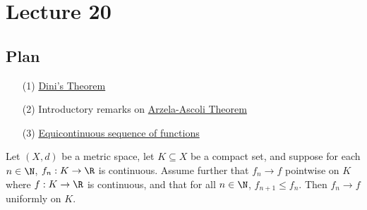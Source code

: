 \section{Lecture 20}

\subsection{Plan}

\begin{enumerate}
    \item[(1)] {\hyperref[Dini's Theorem]{Dini's Theorem}}
    \item[(2)] Introductory remarks on {\hyperref[the Arzela-Ascoli Theorem]{Arzela-Ascoli Theorem}}
    \item[(3)] {\hyperref[Equicontinuous sequence of functions]{Equicontinuous sequence of functions}} 
\end{enumerate}

\begin{theorem}\label{Dini's Theorem}
    Let \( (X,d) \) be a metric space, let \( K \subseteq  X   \) be a compact set, and suppose for each \( n \in \N  \), \( {f}_{n} : K \to \R  \) is continuous. Assume further that \( {f}_{n} \to f  \) pointwise on \( K  \) where \( f : K \to \R  \) is continuous, and that for all \( n \in \N  \), \( {f}_{n+1} \leq {f}_{n} \). Then \( {f}_{n} \to f  \) uniformly on \( K  \). 
\end{theorem}

